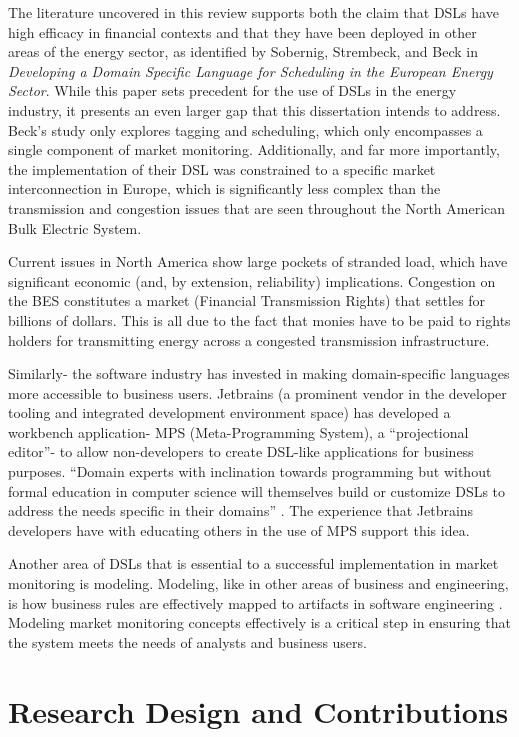 The literature uncovered in this review supports both the claim that DSLs have high efficacy in financial contexts \cite{krasts} and that they have been deployed in other areas of the energy sector, as identified by Sobernig, Strembeck, and Beck \cite {beck} in \textit{Developing a Domain Specific Language for Scheduling in the European Energy Sector}. While this paper sets precedent for the use of DSLs in the energy industry, it presents an even larger gap that this dissertation intends to address. Beck’s study only explores tagging and scheduling, which only encompasses a single component of market monitoring. Additionally, and far more importantly, the implementation of their DSL was constrained to a specific market interconnection in Europe, which is significantly less complex than the transmission and congestion issues that are seen throughout the North American Bulk Electric System.

Current issues in North America show large pockets of stranded load, which have significant economic (and, by extension, reliability) implications. Congestion on the BES constitutes a market (Financial Transmission Rights) that settles for billions of dollars. This is all due to the fact that monies have to be paid to rights holders for transmitting energy across a congested transmission infrastructure. 

Similarly- the software industry has invested in making domain-specific languages more accessible to business users. Jetbrains (a prominent vendor in the developer tooling and integrated development environment space) has developed a workbench application- MPS (Meta-Programming System), a “projectional editor”- to allow non-developers to create DSL-like applications for business purposes. “Domain experts with inclination towards programming but without formal education in computer science will themselves build or customize DSLs to address the needs specific in their domains” \cite{ratiu}. The experience that Jetbrains developers have with educating others in the use of MPS support this idea.

Another area of DSLs that is essential to a successful implementation in market monitoring is modeling. Modeling, like in other areas of business and engineering, is how business rules are effectively mapped to artifacts in software engineering \cite{lethrech}. Modeling market monitoring concepts effectively is a critical step in ensuring that the system meets the needs of analysts and business users.

\section{Research Design and Contributions}

